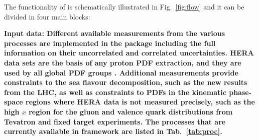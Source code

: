 %
\label{sec:structure}
The functionality of \fitter is schematically illustrated in Fig.~\ref{fig:flow} and it can be divided in four main blocks: %

\begin{description}
\item 
\bf {Input data:} \rm Different available measurements from the various processes
are implemented in the \fitter package including the full information on their uncorrelated and correlated
uncertainties. HERA data sets are the basis of any proton PDF extraction, 
and they are used by all global PDF groups \cite{MSTWpdf, CT10pdf, NNPDFpdf, ABMpdf, JRpdf}. 
Additional measurements provide constraints to the sea flavour decomposition, such as the new 
results from the LHC, as well as constraints to PDFs in the kinematic phase-space regions 
where HERA data is not measured precisely, such as the high $x$ region for the gluon and valence 
quark distributions from Tevatron and fixed target experiments.
The processes that are currently available in \fitter framework are listed in Tab.~\ref{tab:proc}.
%
\begin{table}
\small
\scriptsize


\end{table}
\end{description}
